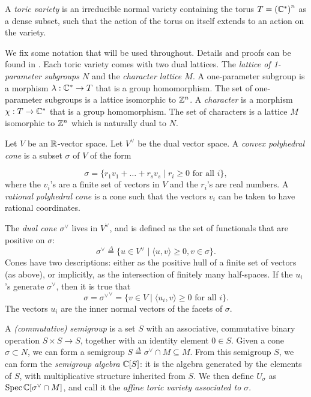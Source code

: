 \begin{definition}
A \emph{toric variety} is an irreducible normal variety containing the torus ${T={(\mathbb{C}^\ast)}^n}$  as a dense subset, such that the action of the torus on itself extends to an action on the variety.
\end{definition}

We fix some notation that will be used throughout. Details and proofs can be found in \cite{cox_toric,fulton_toric}. Each toric variety comes with two dual lattices. The \emph{lattice of 1-parameter subgroups $N$} and the \emph{character lattice $M$}. A one-parameter subgroup is a morphism $\lambda:\mathbb{C} ^\ast \to T$ that is a group homomorphism. The set of one-parameter subgroups is a lattice isomorphic to $\mathbb{Z}^n$. A \emph{character} is a morphism $\chi:T \to \mathbb{C}^\ast$ that is a group homomorphism. The set of characters is a lattice $M$ isomorphic to $\mathbb{Z}^n$ which is naturally dual to $N$.

Let $V$ be an $\mathbb{R}$-vector space. Let $V^\vee$ be the dual vector space. A \emph{convex polyhedral cone} is a subset $\sigma$ of $V$ of the form

$$
\sigma = \{ r_1 v_1 + \dots + r_s v_s \mid r_i \geq 0 \text{ for all } i \},
$$
where the $v_i$'s are a finite set of vectors in $V$ and the $r_i$'s are real numbers. A \emph{rational polyhedral cone} is a cone such that the vectors $v_i$ can be taken to have rational coordinates.

The \emph{dual cone $\sigma^\vee$} lives in $V^\vee$, and is defined as the set of functionals that are positive on $\sigma$:
$$
\sigma^\vee \stackrel{\Delta}{=} \{ u \in V^\vee \mid \langle u,v\rangle \geq 0, v \in \sigma \}.
$$
Cones have two descriptions: either as the positive hull of a finite set of vectors (as above), or implicitly, as the intersection of finitely many half-spaces. If the $u_i$'s generate $\sigma^\vee$, then it is true that
$$
\sigma = {\sigma^\vee}^ \vee  = \{ v \in V \mid \langle u_i,v \rangle \geq 0 \text{ for all } i \}.
$$
The vectors $u_i$ are the inner normal vectors of the facets of $\sigma$.

A \emph{(commutative) semigroup} is a set $S$ with an associative, commutative binary operation $S \times S \to S$, together with an identity element $0 \in S$. Given a cone $\sigma \subset N$, we can form a semigroup $S\stackrel{\Delta}{=} \sigma^\vee \cap M \subseteq M$. From this semigroup $S$, we can form the \emph{semigroup algebra} $\mathbb{C}[S]$: it is the algebra generated by the elements of $S$, with multiplicative structure inherited from $S$. We then define $U_\sigma$ as $\operatorname{Spec} \mathbb{C}[\sigma^\vee \cap M]$, and call it the \emph{affine toric variety associated to $\sigma$}. 

